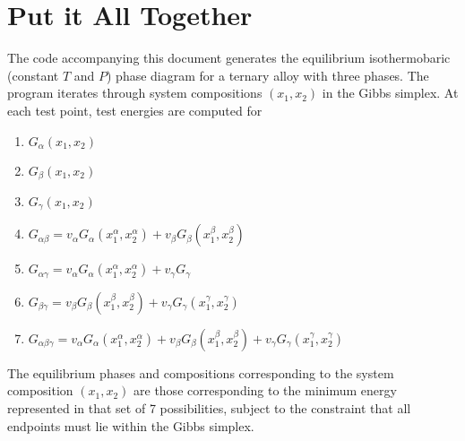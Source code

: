 \documentclass[10pt]{article}
\begin{document}
\section*{Put it All Together}

The code accompanying this document generates the equilibrium isothermobaric
(constant $T$ and $P$) phase diagram for a ternary alloy with three phases. The
program iterates through system compositions $(x_1, x_2)$ in the Gibbs simplex.
At each test point, test energies are computed for
\begin{enumerate}
  \item $G_{\alpha}(x_1, x_2)$
  \item $G_{\beta}(x_1, x_2)$
  \item $G_{\gamma}(x_1, x_2)$
  \item $G_{\alpha\beta} = v_{\alpha}G_{\alpha}(x_1^{\alpha}, x_2^{\alpha})
                         + v_{\beta}G_{\beta}(x_1^{\beta}, x_2^{\beta})$
  \item $G_{\alpha\gamma} = v_{\alpha}G_{\alpha}(x_1^{\alpha}, x_2^{\alpha})
                          + v_{\gamma}G_{\gamma}$
  \item $G_{\beta\gamma} = v_{\beta}G_{\beta}(x_1^{\beta}, x_2^{\beta})
                         + v_{\gamma}G_{\gamma}(x_1^{\gamma}, x_2^{\gamma})$
  \item $G_{\alpha\beta\gamma} = v_{\alpha}G_{\alpha}(x_1^{\alpha}, x_2^{\alpha})
                               + v_{\beta}G_{\beta}(x_1^{\beta}, x_2^{\beta})
                               + v_{\gamma}G_{\gamma}(x_1^{\gamma}, x_2^{\gamma})$
\end{enumerate}
The equilibrium phases and compositions corresponding to the system composition
$(x_1, x_2)$ are those corresponding to the minimum energy represented in that
set of 7 possibilities, subject to the constraint that all endpoints must lie
within the Gibbs simplex.
  
\end{document}

